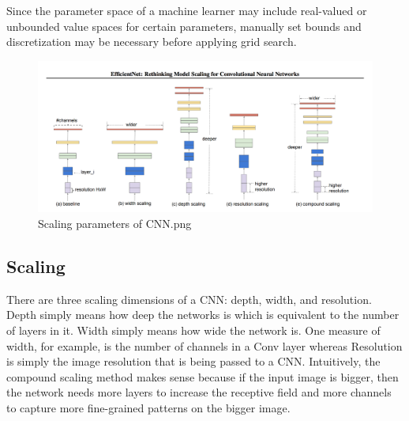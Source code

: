 Since the parameter space of a machine learner may include real-valued or unbounded value spaces for certain parameters, manually set bounds and discretization may be necessary before applying grid search.
\begin{figure}[htpb]
\centering
\includegraphics[width=\textwidth,height=\textheight,keepaspectratio]{../../static/Scaling parameters of CNN.png}
\caption{Scaling parameters of CNN.png}
\end{figure}
\subsection{Scaling}

There are three scaling dimensions of a CNN: depth, width, and resolution. Depth simply means how deep the networks is which is equivalent to the number of layers in it. Width simply means how wide the network is. One measure of width, for example, is the number of channels in a Conv layer whereas Resolution is simply the image resolution that is being passed to a CNN. Intuitively, the compound scaling method makes sense because if the input image is bigger, then the network needs more layers to increase the receptive field and more channels to capture more fine-grained patterns on the bigger image.